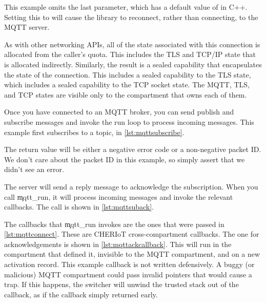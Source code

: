 This example omits the last parameter, which has a default value of  in C++.
Setting this to  will cause the library to reconnect, rather than connecting, to the MQTT server.

\codelisting[filename=examples/mqtt/mqtt.cc,marker=connecting,label=lst:mqttconnect,caption="Connecting to an MQTT broker."]{}

As with other networking APIs, all of the state associated with this connection is allocated from the caller's quota.
This includes the TLS and TCP/IP state that is allocated indirectly.
Similarly, the result is a sealed capability that encapsulates the state of the connection.
This includes a sealed capability to the TLS state, which includes a sealed capability to the TCP socket state.
The MQTT, TLS, and TCP states are visible only to the compartment that owns each of them.

Once you have connected to an MQTT broker, you can send publish and subscribe messages and invoke the run loop to process incoming messages.
This example first subscribes to a topic, in \ref{lst:mqttsubscribe}.

\codelisting[filename=examples/mqtt/mqtt.cc,marker=subscribe,label=lst:mqttsubscribe,caption="Subscribing to an MQTT topic."]{}

The return value will be either a negative error code or a non-negative packet ID.
We don't care about the packet ID in this example, so simply assert that we didn't see an error.


The server will send a reply message to acknowledge the subscription.
When you call \c{mqtt_run}, it will process incoming messages and invoke the relevant callbacks.
The call is shown in \ref{lst:mqttsuback}.

\codelisting[filename=examples/mqtt/mqtt.cc,marker=suback,label=lst:mqttsuback,caption="Waiting for acknowledgement after subscribing to an MQTT topic."]{}

The callbacks that \c{mqtt_run} invokes are the ones that were passed in \ref{lst:mqttconnect}.
These are CHERIoT cross-compartment callbacks.
The one for acknowledgements is shown in \ref{lst:mqttackcallback}.
This will run in the compartment that defined it, invisible to the MQTT compartment, and on a new  activation record.
This example callback is not written defensively.
A buggy (or malicious) MQTT compartment could pass invalid pointers that would cause a trap.
If this happens, the switcher will unwind the trusted stack out of the callback, as if the callback simply returned early.

